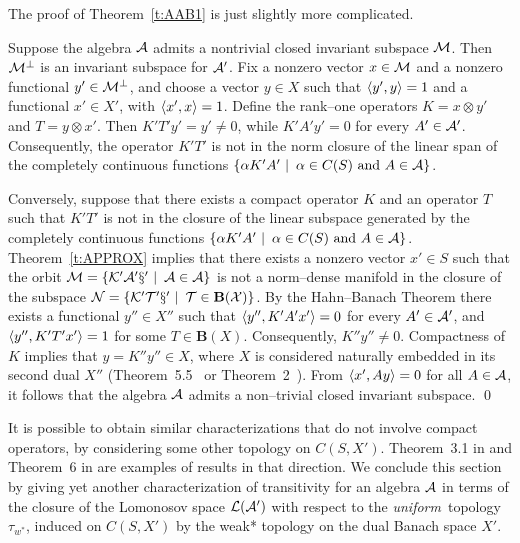 \bigskip

The proof of Theorem~\ref{t:AAB1} is just slightly more
complicated.

\medskip

Suppose the algebra ${\cal A}$ admits a nontrivial closed invariant
subspace $\cal M$. Then $\cal M^\perp$ is an invariant subspace
for ${\cal A}'$. Fix a nonzero vector $x \in \cal M$ and a nonzero
functional $y'\in\cal{}M^\perp$, and choose a vector $y \in X$
such that $\left<y',y\right>=1$ and a functional $x'\in X'$, with
$\left<x',x\right>=1$. Define the rank--one operators $K=x\otimes y'$
and $T=y \otimes x'$. Then $K'T'y'=y'\neq0$, while $K' A' y' =
0$ for every $A' \in {\cal A}'$. Consequently, the operator $K'T'$ is
not in the norm closure of the linear span of the completely
continuous functions $\left\{ \alpha K' A' \,\,|\,\,\, \alpha \in
C(S) \text{ and } A \in {\cal A}\right\}$.

\smallskip

Conversely, suppose that there exists a compact operator $K$
and an operator $T$ such that $K'T'$ is not in the closure of
the linear subspace generated by the completely continuous
functions $\left\{ \alpha K' A' \,\,|\,\,\, \alpha \in C(S)
\text{ and } A \in {\cal A}\right\}$. Theorem~\ref{t:APPROX} implies that
there exists a nonzero vector $x'\in{}S$ such that the orbit
$\cal{M}=\left\{K'A'x'\,\,|\,\,\, A\in{\cal A}\right\}$ is not a norm--dense
manifold in the closure of the subspace
$\cal{N}=\left\{K'T'x'\,\,|\,\,\, T\in\mathbf{B}(X)\right\}$. By the
Hahn--Banach Theorem there exists a functional $y''\in X''$
such that $\left<y'',K'A'x'\right>=0$ for every $A'\in{\cal A}'$, and
$\left<y'',K'T'x'\right>=1$ for some $T \in \mathbf{B}(X)$.
Consequently, $K''y''\neq0$. Compactness of $K$ implies that
$y=K''y''\in X$, where $X$ is considered naturally embedded in
its second dual $X''$ (Theorem~5.5~\cite[p.\,185]{Con90} or
Theorem~2~\cite[p.\,482]{DS57}). From $\left<x',A{}y\right>=0$ for all
$A\in{\cal A}$, it follows that the algebra ${\cal A}$ admits a
non--trivial closed invariant subspace. \qed

\medskip

It is possible to obtain similar characterizations that do not
involve compact operators, by considering some other topology
on $C(S,X')$. Theorem~3.1 in \cite{AAB95} and Theorem~6 in
\cite{dB93} are examples of results in that direction. We
conclude this section by giving yet another characterization of
transitivity for an algebra ${\cal A}$ in terms of the closure of the
Lomonosov space $\cal{L}({\cal A}')$ with respect to the {\em
uniform}\, topology $\tau_{w^*}$, induced on $C(S,X')$ by the
weak* topology on the dual Banach space $X'$.

